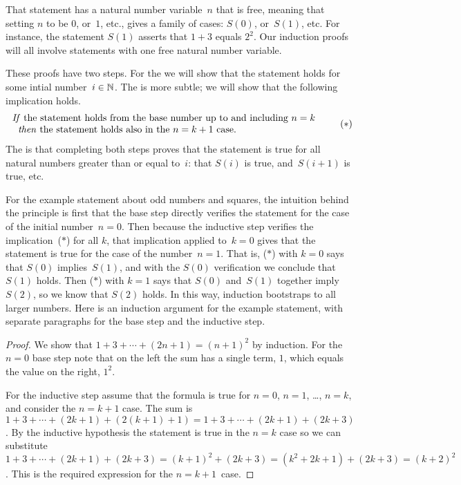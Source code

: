 \documentclass{ibl}  %
\begin{document}
That statement has a natural number variable~$n$ that is free, 
meaning that setting $n$ to be $0$, or~$1$, etc., gives 
a family of cases: $S(0)$, or~$S(1)$, 
etc.  
For instance, the statement $S(1)$ asserts that $1+3$ equals $2^2$.
Our induction proofs will all involve statements with one free 
natural number variable.

These proofs have two steps.
For the  
we will show that the statement holds for some intial number~$i\in\mathbb{N}$.
The  is more subtle;
we will show that the following implication holds.
\begin{equation*}
  \begin{tabular}{l} 
  \textit{If} the statement holds from the
   base number up to and including $n=k$  \\
  \hspace*{0.618em}\textit{then} the statement holds also in the~$n=k+1$ case.
  \end{tabular}
  \tag{$*$}
\end{equation*}
The  is that
completing both steps proves 
that the statement is true for all natural
numbers greater than or equal to~$i$: 
that $S(i)$ is true, and~$S(i+1)$ is true, etc.

For the example statement about odd numbers and squares, 
the intuition behind the principle is first that the base step
directly verifies the statement for the case of the initial number~$n=0$.
Then because the inductive step verifies the implication~($*$) for all $k$, 
that implication applied to~$k=0$ gives 
that the statement is true for the case of the number~$n=1$.
That is, ($*$) with $k=0$ says that $S(0)$ implies~$S(1)$, and with the $S(0)$
verification we conclude that $S(1)$ holds.
Then ($*$) with $k=1$ says that $S(0)$ and~$S(1)$ together imply~$S(2)$, 
so we know that $S(2)$ holds.
In this way, induction bootstraps to all larger numbers.
Here is an induction argument for the example statement, 
with separate paragraphs for the base step and the inductive step.

\begin{proof}
  We show that $1+3+\cdots+(2n+1)=(n+1)^2$ by induction.
  For the $n=0$ base step note that on the left the sum has a single term, $1$,
  which equals the value on the right, $1^2$.

  For the inductive step assume that the 
  formula is true for $n=0$, $n=1$, \ldots, $n=k$, and 
  consider the $n=k+1$ case.
  The sum is $1+3+\cdots+(2k+1)+(2(k+1)+1)=1+3+\cdots+(2k+1)+(2k+3)$.
  By the inductive hypothesis the statement is true in the $n=k$ case
  so we can substitute 
  $1+3+\cdots+(2k+1)+(2k+3)=(k+1)^2+(2k+3)=(k^2+2k+1)+(2k+3)=(k+2)^2$.
  This is the required expression for the $n=k+1$~case.
\end{proof}
\end{document}
